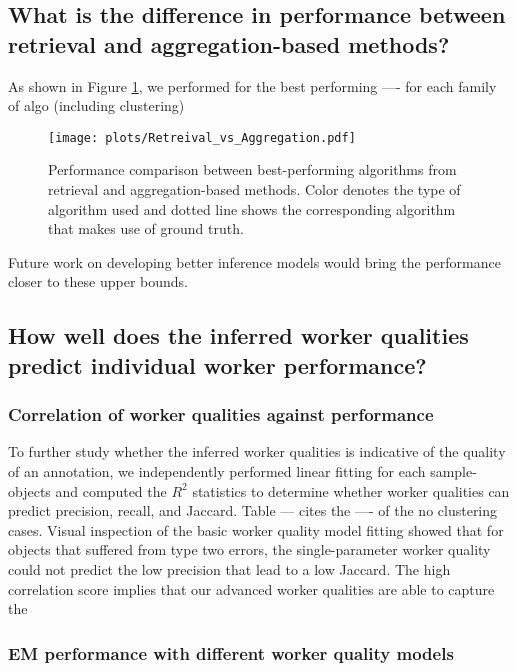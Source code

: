   \subsection{What is the difference in performance between retrieval and aggregation-based methods?}
    As shown in Figure \ref{retreival_vs_aggregation}, we performed for the best performing ---- for each family of algo (including clustering)
    \begin{figure}[ht!]
      \centering
      \texttt{[image: plots/Retreival\_vs\_Aggregation.pdf]}
      \caption{Performance comparison between best-performing algorithms from retrieval and aggregation-based methods. Color denotes the type of algorithm used and dotted line shows the corresponding algorithm that makes use of ground truth.}
      \label{retreival_vs_aggregation}
    \end{figure}
       Future work on developing better inference models would bring the performance closer to these upper bounds.
      
  \subsection{How well does the inferred worker qualities predict individual worker performance?}
    \subsubsection{Correlation of worker qualities against performance}
     To further study whether the inferred worker qualities is indicative of the quality of an annotation, we independently performed linear fitting for each sample-objects and computed the $R^2$ statistics to determine whether worker qualities can predict precision, recall, and Jaccard. Table --- cites the ---- of the no clustering cases. Visual inspection of the basic worker quality model fitting showed that for objects that suffered from type two errors, the single-parameter worker quality could not predict the low precision that lead to a low Jaccard. The high correlation score implies that our advanced worker qualities are able to capture the 
    \subsubsection{EM performance with different worker quality models}



